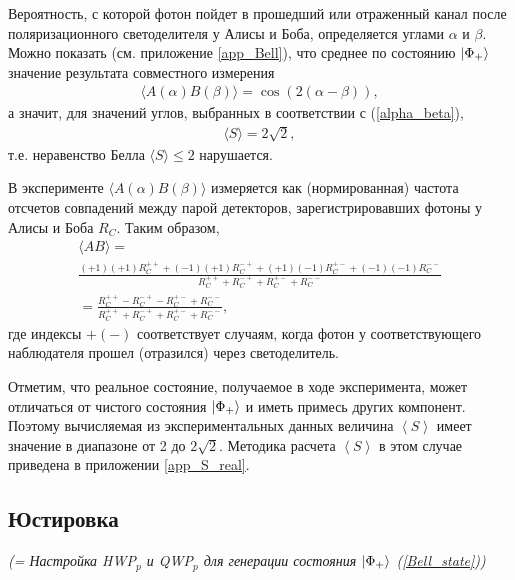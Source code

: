 \documentclass[12pt,a5paper]{article}
\numberwithin{equation}{section}
\begin{document}
Вероятность, с которой фотон пойдет в прошедший или отраженный канал после поляризационного светоделителя у Алисы и Боба, определяется углами $\alpha$ и $\beta$. Можно показать (см. приложение \ref{app_Bell}), что среднее по состоянию $\ket{\Phi_+}$ значение результата совместного измерения
\begin{gather}
\langle A(\alpha)B(\beta) \rangle = \cos(2(\alpha-\beta)),
\label{ABquantum1}
\end{gather}
а значит, для значений углов, выбранных в соответствии с (\ref{alpha_beta}),
\begin{gather}
\langle S \rangle = 2\sqrt2,
\label{Squantum2}
\end{gather}
т.е. неравенство Белла $\langle S \rangle\leq2$ нарушается.

В эксперименте $\langle A(\alpha)B(\beta) \rangle $ измеряется как (нормированная) частота отсчетов совпадений между парой детекторов, зарегистрировавших фотоны у Алисы и Боба $R_C$. Таким образом,
\begin{gather}
\langle AB \rangle=\nonumber\\
\frac{(+1)(+1) R_C^{++} + (-1)(+1) R_C^{-+} + (+1)(-1) R_C^{+-} + (-1)(-1)R_C^{--}}{R_C^{++}+R_C^{-+}+R_C^{+-}+R_C^{--}}  \nonumber\\
=\frac{R_C^{++} - R_C^{-+} - R_C^{+-} + R_C^{--}}{R_C^{++}+R_C^{-+}+R_C^{+-}+R_C^{--}},
\label{ABquantum3}
\end{gather}
где индексы $+(-)$ соответствует случаям, когда фотон у соответствующего наблюдателя прошел (отразился) через светоделитель.

Отметим, что реальное состояние, получаемое в ходе эксперимента, может отличаться от чистого состояния $\ket{\Phi_+}$ и иметь примесь других компонент. Поэтому вычисляемая из экспериментальных данных величина $\left<S\right>$ имеет значение в диапазоне от 2 до $2\sqrt{2}$. Методика расчета $\left<S\right>$ в этом случае приведена в приложении \ref{app_S_real}.

\subsection{Юстировка}
\textit{(= Настройка HWP$_p$ и QWP$_p$ для генерации состояния $\ket{\Phi_+}$ (\ref{Bell_state}))}
\end{document}
